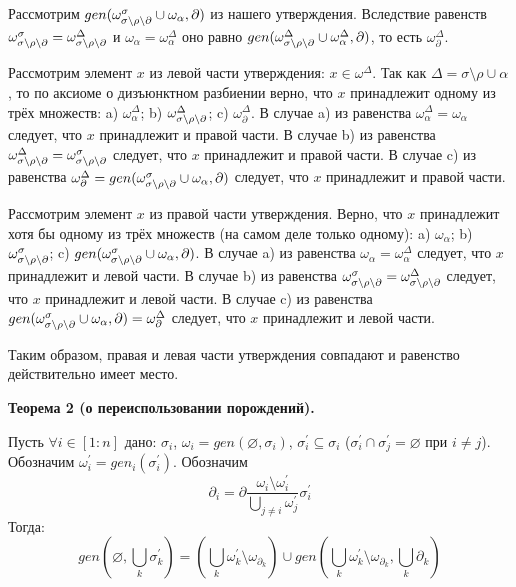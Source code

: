 Рассмотрим $gen(\omega^\sigma_{\sigma\setminus\rho\setminus\partial} \cup \omega_\alpha, \partial)$ из нашего утверждения. Вследствие равенств $\omega^\sigma_{\sigma\setminus\rho\setminus\partial} = \omega^\Delta_{\sigma\setminus\rho\setminus\partial}$ и $\omega_\alpha = \omega^\Delta_\alpha$ оно равно $gen(\omega^\Delta_{\sigma\setminus\rho\setminus\partial} \cup \omega^\Delta_\alpha, \partial)$, то есть $\omega^\Delta_\partial$.

Рассмотрим элемент $x$ из левой части утверждения: $x \in \omega^\Delta$. Так как $\Delta = \sigma\setminus\rho\cup\alpha$, то по аксиоме о дизъюнктном разбиении верно, что $x$ принадлежит одному из трёх множеств: a) $\omega^\Delta_\alpha$; b) $\omega^\Delta_{\sigma\setminus\rho\setminus\partial}$; c) $\omega^\Delta_\partial$. В случае a) из равенства $\omega^\Delta_\alpha = \omega_\alpha$ следует, что $x$ принадлежит и правой части. В случае b) из равенства $\omega^\Delta_{\sigma\setminus\rho\setminus\partial} = \omega^\sigma_{\sigma\setminus\rho\setminus\partial}$ следует, что $x$ принадлежит и правой части. В случае c) из равенства $\omega^\Delta_\partial = gen(\omega^\sigma_{\sigma\setminus\rho\setminus\partial} \cup \omega_\alpha, \partial)$ следует, что $x$ принадлежит и правой части.

Рассмотрим элемент $x$ из правой части утверждения. Верно, что $x$ принадлежит хотя бы одному из трёх множеств (на самом деле только одному): a) $\omega_\alpha$; b) $\omega^\sigma_{\sigma\setminus\rho\setminus\partial}$; c) $gen(\omega^\sigma_{\sigma\setminus\rho\setminus\partial} \cup \omega_\alpha, \partial)$. В случае a) из равенства $\omega_\alpha = \omega^\Delta_\alpha$ следует, что $x$ принадлежит и левой части. В случае b) из равенства $\omega^\sigma_{\sigma\setminus\rho\setminus\partial} = \omega^\Delta_{\sigma\setminus\rho\setminus\partial}$ следует, что $x$ принадлежит и левой части. В случае c) из равенства $gen(\omega^\sigma_{\sigma\setminus\rho\setminus\partial} \cup \omega_\alpha, \partial) = \omega^\Delta_\partial$ следует, что $x$ принадлежит и левой части.

Таким образом, правая и левая части утверждения совпадают и равенство действительно имеет место.

\newpage

\textbf{Теорема 2 (о переиспользовании порождений).}

Пусть $\forall i \in [1:n]$ дано: $\sigma_i$, $\omega_i = gen(\varnothing, \sigma_i)$, $\sigma_i^\prime \subseteq \sigma_i$ ($\sigma_i^\prime \cap \sigma_j^\prime = \varnothing$ при $i \neq j$). Обозначим $\omega_i^\prime = gen_i(\sigma_i^\prime)$. Обозначим 
$$\partial_i = \partial\dfrac{\omega_i \setminus \omega_i^\prime}{\bigcup\limits_{j \neq i} \omega_j^\prime} \sigma_i^\prime$$
Тогда:
$$gen(\varnothing, \bigcup\limits_k \sigma^\prime_k) = \left( \bigcup\limits_k \omega_k^\prime \setminus \omega_{\partial_k} \right) \cup gen(\bigcup\limits_k \omega_k^\prime \setminus \omega_{\partial_k}, \bigcup\limits_k \partial_k)$$

